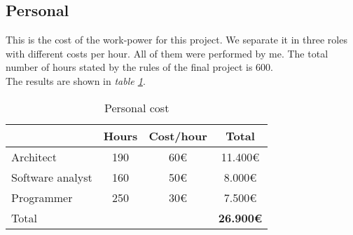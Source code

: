 \subsection{Personal}
This is the cost of the work-power for this project. We separate it in three roles with different costs per hour. All of them were
performed by me. The total number of hours stated by the rules of the final project is 600.\\
The results are shown in \emph{table \ref{tab:personal}}.
\begin{table}[h]
  \begin{center}
    \begin{tabular}{ l c c | c |}
      \cline{2-4}
      & \multicolumn{1}{|l|}{Hours} & \multicolumn{1}{|c|}{Cost/hour} & Total \\ \hline
      \multicolumn{1}{|l|}{Architect} & \multicolumn{1}{|c|}{190} & \multicolumn{1}{|c|}{60€} & 11.400€ \\ \hline
      \multicolumn{1}{|l|}{Software analyst} & \multicolumn{1}{|c|}{160} & \multicolumn{1}{|c|}{50€} & 8.000€\\ \hline
      \multicolumn{1}{|l|}{Programmer} & \multicolumn{1}{|c|}{250} & \multicolumn{1}{|c|}{30€} & 7.500€\\
      \hline
      \hline
      \multicolumn{1}{|l}{Total} & & & {\bf 26.900€}\\
      \hline
    \end{tabular}
  \end{center}
  \caption{Personal cost}
  \label{tab:personal}
\end{table}